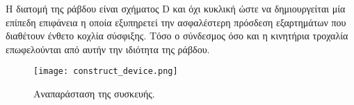 Η διατομή της ράβδου είναι σχήματος D και όχι κυκλική ώστε να δημιουργείται μία
επίπεδη επιφάνεια η οποία εξυπηρετεί την ασφαλέστερη πρόσδεση εξαρτημάτων που
διαθέτουν ένθετο κοχλία σύσφιξης. Τόσο ο σύνδεσμος όσο και η κινητήρια τροχαλία
επωφελούνται από αυτήν την ιδιότητα της ράβδου.

\begin{figure}
    \caption{Αναπαράσταση της συσκευής.}
    \begin{center}%
    \texttt{[image: construct\_device.png]}
    \end{center}
\end{figure}















